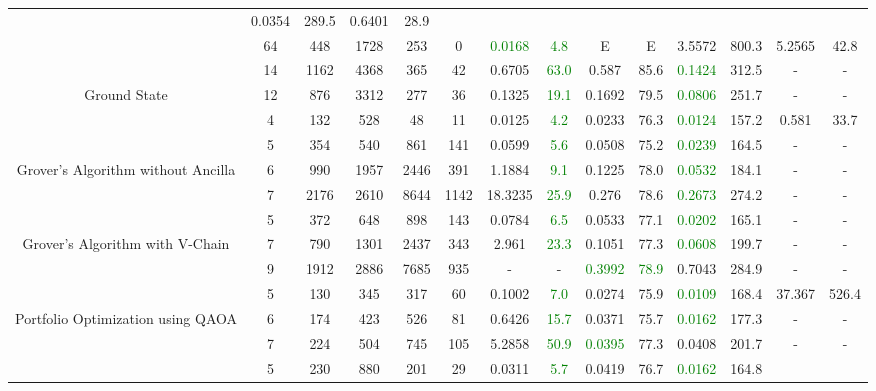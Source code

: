 \begin{table}[htb]
{\begin{tabular}{|c|c|c|c|c|c|c|c|c|c|c|c|c|c|}
 & 0.0354 & 289.5
 & 0.6401 & 28.9
 \\
 & 
64 & 448 & 1728 & 253 & 0
 & \textcolor{green}{0.0168} & \textcolor{green}{4.8}
 & E & E
 & 3.5572 & 800.3
 & 5.2565 & 42.8
 \\
\hline
 & 
14 & 1162 & 4368 & 365 & 42
 & 0.6705 & \textcolor{green}{63.0}
 & 0.587 & 85.6
 & \textcolor{green}{0.1424} & 312.5
 & - & -
 \\
Ground State & 
12 & 876 & 3312 & 277 & 36
 & 0.1325 & \textcolor{green}{19.1}
 & 0.1692 & 79.5
 & \textcolor{green}{0.0806} & 251.7
 & - & -
 \\
 & 
4 & 132 & 528 & 48 & 11
 & 0.0125 & \textcolor{green}{4.2}
 & 0.0233 & 76.3
 & \textcolor{green}{0.0124} & 157.2
 & 0.581 & 33.7
 \\
\hline
 & 
5 & 354 & 540 & 861 & 141
 & 0.0599 & \textcolor{green}{5.6}
 & 0.0508 & 75.2
 & \textcolor{green}{0.0239} & 164.5
 & - & -
 \\
Grover's Algorithm without Ancilla & 
6 & 990 & 1957 & 2446 & 391
 & 1.1884 & \textcolor{green}{9.1}
 & 0.1225 & 78.0
 & \textcolor{green}{0.0532} & 184.1
 & - & -
 \\
 & 
7 & 2176 & 2610 & 8644 & 1142
 & 18.3235 & \textcolor{green}{25.9}
 & 0.276 & 78.6
 & \textcolor{green}{0.2673} & 274.2
 & - & -
 \\
\hline
 & 
5 & 372 & 648 & 898 & 143
 & 0.0784 & \textcolor{green}{6.5}
 & 0.0533 & 77.1
 & \textcolor{green}{0.0202} & 165.1
 & - & -
 \\
Grover's Algorithm with V-Chain & 
7 & 790 & 1301 & 2437 & 343
 & 2.961 & \textcolor{green}{23.3}
 & 0.1051 & 77.3
 & \textcolor{green}{0.0608} & 199.7
 & - & -
 \\
 & 
9 & 1912 & 2886 & 7685 & 935
 & - & -
 & \textcolor{green}{0.3992} & \textcolor{green}{78.9}
 & 0.7043 & 284.9
 & - & -
 \\
\hline
 & 
5 & 130 & 345 & 317 & 60
 & 0.1002 & \textcolor{green}{7.0}
 & 0.0274 & 75.9
 & \textcolor{green}{0.0109} & 168.4
 & 37.367 & 526.4
 \\
Portfolio Optimization using QAOA & 
6 & 174 & 423 & 526 & 81
 & 0.6426 & \textcolor{green}{15.7}
 & 0.0371 & 75.7
 & \textcolor{green}{0.0162} & 177.3
 & - & -
 \\
 & 
7 & 224 & 504 & 745 & 105
 & 5.2858 & \textcolor{green}{50.9}
 & \textcolor{green}{0.0395} & 77.3
 & 0.0408 & 201.7
 & - & -
 \\
\hline
 & 
5 & 230 & 880 & 201 & 29
 & 0.0311 & \textcolor{green}{5.7}
 & 0.0419 & 76.7
 & \textcolor{green}{0.0162} & 164.8

\end{tabular}}
\end{table}
